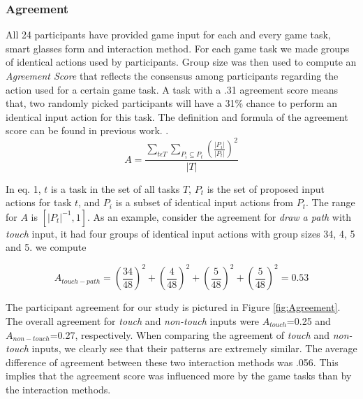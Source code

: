 \documentclass{sigchi}
\begin{document}
   \subsubsection{Agreement}
	All 24 participants have provided game input for each and every game task, smart glasses form and interaction method. For each game task we made groups of identical actions used by participants. Group size was then used to compute an \emph{Agreement Score} that reflects the consensus among participants regarding the action used for a certain game task. A task with a .31 agreement score means that, two randomly picked participants will have a 31\% chance to perform an identical input action for this task. The definition and formula of the agreement score can be found in previous work. \cite{Wobbrock:2005:MGS:1056808.1057043}.
   \begin{equation}
   A = \frac{\displaystyle{\sum_{t\epsilon T }} \sum_{P_i \subseteq P_t } \left(\frac{\lvert{P_i}\rvert}{\lvert{P_t}\rvert}\right) ^ 2}{\displaystyle{\lvert{T}\rvert}}
   \end{equation}
  
   In eq. 1, $t$ is a task in the set of all tasks $T$, $P_{t}$ is the set of proposed input actions for task $t$, and $P_i$ is a subset of identical input actions from $P_{t}$. The range for $A$ is $\left[\lvert{P_t}\rvert ^{-1}, 1\right]$. As an example, consider the agreement for \emph{draw a path} with \emph{touch} input, it had four groups of identical input actions with group sizes 34, 4, 5 and 5. we compute

   \begin{equation}
   A_{touch-path} = \left(\frac{34}{48}\right) ^ 2  + \left(\frac{4}{48}\right) ^ 2 + \left(\frac{5}{48}\right) ^ 2 + \left(\frac{5}{48}\right) ^ 2 = 0.53
   \end{equation}

The participant agreement for our study is pictured in Figure \ref{fig:Agreement}. The overall agreement for \emph{touch} and \emph{non-touch} inputs were $A_{touch}$=0.25 and $A_{non-touch}$=0.27, respectively. When comparing the agreement of \emph{touch} and \emph{non-touch} inputs, we clearly see that their patterns are extremely similar. The average difference of agreement between these two interaction methods was .056. This implies that the agreement score was influenced more by the game tasks than by the interaction methods.
\end{document}
